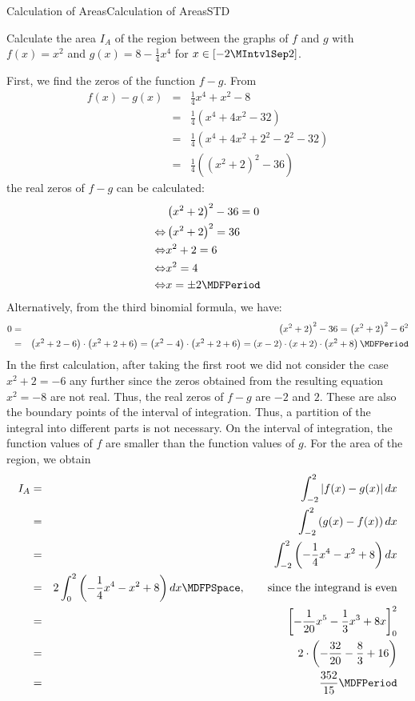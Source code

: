 \begin{MXContent}{Calculation of Areas}{Calculation of Areas}{STD}
\begin{MExample}
Calculate the area $I_A$ of the region between the graphs of $f$ and $g$ with $f(x) = x^2$ and 
$g(x) = 8 - \frac{1}{4} x^4$ for $x \in [-2\MIntvlSep  2]$.

First, we find the zeros of the function $f - g$. From
%
\begin{eqnarray*}
f(x) - g(x) & = & \frac{1}{4} x^4 + x^2 - 8 \\
 & = & \frac{1}{4} \left( x^4 + 4 x^2 - 32 \right) \\
 & = & \frac{1}{4} \left( x^4 + 4 x^2 + 2^2 - 2^2 - 32 \right) \\
 & = & \frac{1}{4} \left( \left( x^2 + 2 \right)^2 - 36 \right) %
\end{eqnarray*}
%
the real zeros of $f - g$ can be calculated:
\begin{eqnarray*}
& \left( x^2 + 2 \right)^2 - 36 = 0 \\
\Leftrightarrow & \left( x^2 + 2 \right)^2 = 36 \\
\Leftrightarrow & x^2 + 2 = 6 \\
\Leftrightarrow & x^2 = 4 \\
\Leftrightarrow & x = \pm 2 \MDFPeriod %
\end{eqnarray*}
Alternatively, from the third binomial formula, we have:
\begin{eqnarray*}
 0 & = & \left( x^2 + 2 \right)^2 - 36 %
 = \left( x^2 + 2 \right)^2 - 6^2 \\
& = & \left(x^2 + 2 - 6 \right) \cdot \left(x^2 + 2 + 6 \right) %
 = \left(x^2 - 4 \right) \cdot \left(x^2 + 2 + 6 \right) %
 = (x - 2) \cdot (x + 2) \cdot \left(x^2 + 8 \right) \MDFPeriod %
\end{eqnarray*}
%
In the first calculation, after taking the first root we did not 
consider the case $x^2 + 2 = -6$ any further since the zeros obtained from
the resulting equation $x^2 = -8$ are not real. Thus, the real zeros of 
$f-g$ are $-2$ and $2$. These are also the boundary points 
of the interval of integration. Thus, a partition of the integral into 
different parts is not necessary. On the interval of integration, the function values 
of $f$ are smaller than the function values of $g$. For the area of the region, we obtain
\begin{eqnarray*}
I_A &=& \int_{-2}^{2} \left|f(x) - g(x)\right| \MD x \\
 & = & \int_{-2}^{2} \left({g(x) - f(x)}\right) \MD x \\
 & = & \int_{-2}^{2} \left({-\frac{1}{4} x^4 - x^2 + 8 }\right) \MD x \\
 & = & 2 \int_{0}^{2} \left({-\frac{1}{4} x^4 - x^2 + 8 }\right) \MD x %
  \MDFPSpace, \qquad \text{since the integrand is even} \\
 & = & \left[{-\frac{1}{20} x^5 - \frac{1}{3} x^3 + 8 x}\right]_{0}^{2} \\
 & = & 2\cdot \left({-\frac{32}{20}-\frac{8}{3}+16}\right) \\
 & = & \frac{352}{15} \MDFPeriod %
\end{eqnarray*}
\end{MExample}


\end{MXContent}
